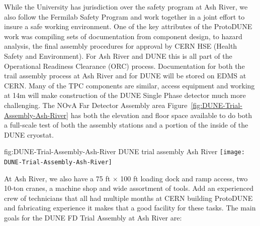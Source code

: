 While the University has jurisdiction over the safety program at Ash River, we also follow the Fermilab Safety Program and work together in a joint effort to insure a safe working environment.  One of the key attributes of the ProtoDUNE work was compiling sets of documentation from component design, to hazard analysis, the final assembly procedures for approval by CERN HSE (Health Safety and Environment). For Ash River and DUNE this is all part of the Operational Readiness Clearance (ORC) process. Documentation for both the trail assembly process at Ash River and for DUNE will be stored on EDMS at CERN. 
Many of the TPC components are similar, access equipment and working at 14m will make construction of the DUNE Single Phase detector much more challenging.   The NOvA Far Detector Assembly area Figure~\ref{fig:DUNE-Trial-Assembly-Ash-River} has both the elevation and floor space available to do both a full-scale test of both the assembly stations and a portion of the inside of the DUNE cryostat. 

\begin{dunefigure} %
{fig:DUNE-Trial-Assembly-Ash-River}  %
{DUNE trial assembly Ash River}  %
\centering
\texttt{[image: DUNE-Trial-Assembly-Ash-River]}
\end{dunefigure}


At Ash River, we also have a 75 \si{ft} $\times$  100 \si{ft} loading dock and ramp access, two 10-ton cranes, a machine shop and wide assortment of tools.  Add an experienced crew of technicians that all had multiple months at CERN building ProtoDUNE and fabricating experience it makes that a good facility for these tasks. 
The main goals for the DUNE FD Trial Assembly at Ash River are:

